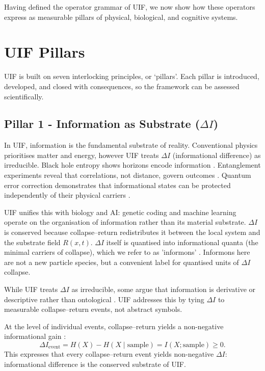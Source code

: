 Having defined the operator grammar of UIF, we now show how these operators express as
measurable pillars of physical, biological, and cognitive systems.
\section{UIF Pillars}

UIF is built on seven interlocking principles, or `pillars'. Each pillar is introduced, developed, and closed with consequences, so the framework can be assessed scientifically.

\subsection {Pillar 1 - Information as Substrate ($\Delta I$)}
In UIF, information is the fundamental substrate of reality. Conventional physics prioritises
matter and energy, however UIF treats $\Delta I$ (informational difference) as irreducible. Black hole entropy shows horizons encode information \cite{Bekenstein1973,Hawking1975}. Entanglement experiments reveal that correlations, not distance, govern outcomes \cite{Bell1964,Aspect1982}. Quantum error correction demonstrates that informational states can be protected independently of their physical carriers \cite{Shor1995}.

UIF unifies this with biology and AI: genetic coding and machine learning operate on the
organisation of information rather than its material substrate. $\Delta I$ is conserved because
collapse–return redistributes it between the local system and the substrate field $R(x,t)$.  $\Delta I$ itself is quantised into informational quanta (the minimal carriers of collapse),  which we refer to as 'informons' \cite{Wheeler1990,Zurek1990}. Informons here are not a new particle species, but a convenient label for quantised units of $\Delta I$ collapse.

While UIF treats $\Delta I$ as irreducible, some argue that information is derivative or descriptive rather than ontological \cite{Timpson2013,Fields2020}. UIF addresses this by
tying $\Delta I$ to measurable collapse–return events, not abstract symbols.

At the level of individual events, collapse--return yields a non-negative informational gain \cite{Shannon1948}:
\begin{equation}
\Delta I_{\text{event}} = H(X) - H\!\left(X \mid \text{sample}\right) = I(X; \text{sample}) \ge 0.
\end{equation}
This expresses that every collapse–return event yields non-negative $\Delta I$: informational
difference is the conserved substrate of UIF.

